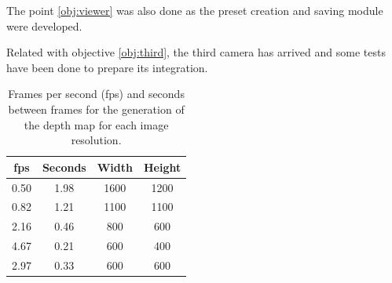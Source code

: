 \documentclass[10pt,a4paper,twocolumn,twoside]{article}
\begin{document}
	The point \ref{obj:viewer} was also done as the preset creation and saving module were developed.
	
	Related with objective \ref{obj:third}, the third camera has arrived and some tests have been done to prepare its integration.
	
	\begin{table}
		\begin{center}
			\begin{tabular}{cccc}
				\toprule
				fps & Seconds & Width & Height \\ 
				\midrule
				0.50 & 1.98 & 1600 & 1200 \\ 
				
				0.82 & 1.21 & 1100 & 1100 \\ 
				
				2.16 & 0.46 & 800 & 600 \\ 
				
				4.67 & 0.21 & 600 & 400 \\ 
				
				2.97 & 0.33 & 600 & 600 \\ 
				\bottomrule
				
			\end{tabular} 
			\caption{Frames per second (fps) and seconds between frames for the generation of the depth map for each image resolution.}
			\label{tab:depthmap}
		\end{center}
	\end{table}
\end{document}
